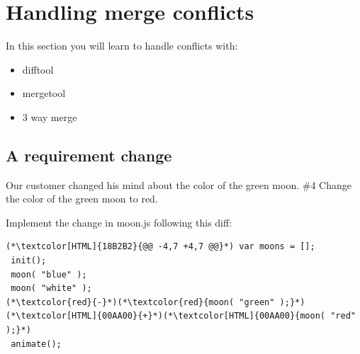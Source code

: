 \section{Handling merge conflicts}
\begin{frame}[fragile]
    \slidetitle
  In this section you will learn to handle conflicts with:
  \begin{itemize}
\item difftool
\item mergetool
\item 3 way merge
\end{itemize}
\end{frame}

\subsection{A requirement change}
\begin{frame}[fragile]
    \subslidetitle
  Our customer changed his mind about the color of the green moon.
  \newline \vspace{1em}
  \#4 Change the color of the green moon to red.

  Implement the change in moon.js following this diff:
\begin{lstlisting}
(*\textcolor[HTML]{18B2B2}{@@ -4,7 +4,7 @@}*) var moons = [];
 init();
 moon( "blue" );
 moon( "white" );
(*\textcolor{red}{-}*)(*\textcolor{red}{moon( "green" );}*)
(*\textcolor[HTML]{00AA00}{+}*)(*\textcolor[HTML]{00AA00}{moon( "red" );}*)
 animate();
\end{lstlisting}

\end{frame}

